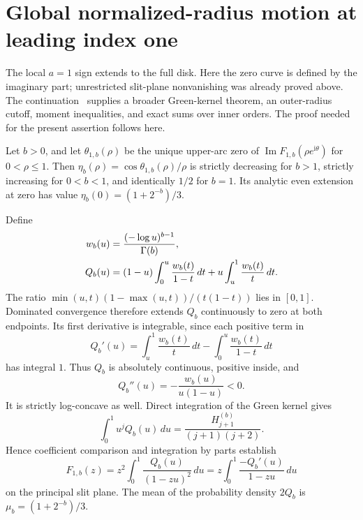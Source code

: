\section{Global normalized-radius motion at leading index one}
\label{lone:sec:global-radius}

The local $a=1$ sign extends to the full disk. Here the zero curve is defined by the imaginary part; unrestricted
slit-plane nonvanishing was already proved above.
The continuation~\cite{lone:report} supplies a broader Green-kernel
theorem, an outer-radius cutoff, moment inequalities, and exact sums over
inner orders. The proof needed for the present assertion follows here.

\begin{theorem}
\label{lone:thm:global-radius}
Let $b>0$, and let $\theta_{1,b}(\rho)$ be the unique upper-arc zero of
$\operatorname{Im}F_{1,b}(\rho e^{\mathrm i\theta})$ for $0<\rho\le1$.
Then $\eta_b(\rho)=\cos\theta_{1,b}(\rho)/\rho$ is strictly decreasing
for $b>1$, strictly increasing for $0<b<1$, and identically $1/2$ for
$b=1$. Its analytic even extension at zero has value
$\eta_b(0)=(1+2^{-b})/3$.
\end{theorem}

Define
\begin{align}
 w_b(u)&=\frac{(-\log u)^{b-1}}{\Gamma(b)},\notag\\
 Q_b(u)&=(1-u)\int_0^u\frac{w_b(t)}{1-t}\,dt
             +u\int_u^1\frac{w_b(t)}t\,dt.
 \label{lone:eq:green}
\end{align}
The ratio $\min(u,t)(1-\max(u,t))/(t(1-t))$ lies in $[0,1]$.
Dominated convergence therefore extends $Q_b$ continuously to zero at
both endpoints. Its first derivative is integrable, since each positive
term in
\[
 Q_b'(u)=\int_u^1\frac{w_b(t)}t\,dt
                 -\int_0^u\frac{w_b(t)}{1-t}\,dt
\]
has integral $1$. Thus $Q_b$ is absolutely continuous, positive inside,
and
\begin{equation}\label{lone:eq:curvature}
 Q_b''(u)=-\frac{w_b(u)}{u(1-u)}<0.
\end{equation}
It is strictly log-concave as well. Direct integration of the Green
kernel gives
\[
 \int_0^1u^jQ_b(u)\,du
       =\frac{H_{j+1}^{(b)}}{(j+1)(j+2)}.
\]
Hence coefficient comparison and integration by parts establish
\begin{equation}\label{lone:eq:stieltjes}
 F_{1,b}(z)=z^2\int_0^1\frac{Q_b(u)}{(1-zu)^2}\,du
           =z\int_0^1\frac{-Q_b'(u)}{1-zu}\,du
\end{equation}
on the principal slit plane. The mean of the probability density $2Q_b$
is $\mu_b=(1+2^{-b})/3$.

